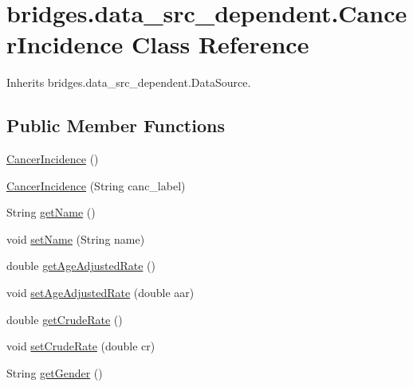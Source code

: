 \hypertarget{classbridges_1_1data__src__dependent_1_1_cancer_incidence}{}\section{bridges.\+data\+\_\+src\+\_\+dependent.\+Cancer\+Incidence Class Reference}
\label{classbridges_1_1data__src__dependent_1_1_cancer_incidence}


Inherits bridges.\+data\+\_\+src\+\_\+dependent.\+Data\+Source.

\subsection*{Public Member Functions}
\begin{DoxyCompactItemize}
\item 
\hyperlink{classbridges_1_1data__src__dependent_1_1_cancer_incidence_a92db1eb4292c77f07619019587caf5cc}{Cancer\+Incidence} ()
\item 
\hyperlink{classbridges_1_1data__src__dependent_1_1_cancer_incidence_a3db553c2769892563c3f1ebb033ba4c6}{Cancer\+Incidence} (String canc\+\_\+label)
\item 
String \hyperlink{classbridges_1_1data__src__dependent_1_1_cancer_incidence_ac7958f37807979cf06e712373f080b9a}{get\+Name} ()
\item 
void \hyperlink{classbridges_1_1data__src__dependent_1_1_cancer_incidence_a1aef58b128adfd1e2a31ab9726247e9e}{set\+Name} (String name)
\item 
double \hyperlink{classbridges_1_1data__src__dependent_1_1_cancer_incidence_a87bc1cbc5a72eb9b4df5ff7ab4843ae8}{get\+Age\+Adjusted\+Rate} ()
\item 
void \hyperlink{classbridges_1_1data__src__dependent_1_1_cancer_incidence_a26c2d63e8465bcfdab047129312b4897}{set\+Age\+Adjusted\+Rate} (double aar)
\item 
double \hyperlink{classbridges_1_1data__src__dependent_1_1_cancer_incidence_afc2ddb3099dffc46371ad7188278501d}{get\+Crude\+Rate} ()
\item 
void \hyperlink{classbridges_1_1data__src__dependent_1_1_cancer_incidence_a64a737fd7481262650efd596c508ffd6}{set\+Crude\+Rate} (double cr)
\item 
String \hyperlink{classbridges_1_1data__src__dependent_1_1_cancer_incidence_a2c3cbe65d89827c167f15314b8b088b3}{get\+Gender} ()
\item 

\end{DoxyCompactItemize}

